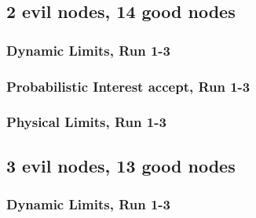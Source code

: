 \documentclass[onecolumn]{IEEEtran}
\begin{document}
\clearpage
\subsection{\textbf{2 evil nodes}, 14 good nodes}

\subsubsection{Dynamic Limits, Run 1-3}

\begin{minipage}[b]{\textwidth}

\end{minipage}

\clearpage

\subsubsection{Probabilistic Interest accept, Run 1-3}

\begin{minipage}[b]{\textwidth}

\end{minipage}

\clearpage

\subsubsection{Physical Limits, Run 1-3}

\begin{minipage}[b]{\textwidth}

\end{minipage}

\clearpage
\subsection{\textbf{3 evil nodes}, 13 good nodes}

\subsubsection{Dynamic Limits, Run 1-3}

\begin{minipage}[b]{\textwidth}

\end{minipage}
\end{document}
